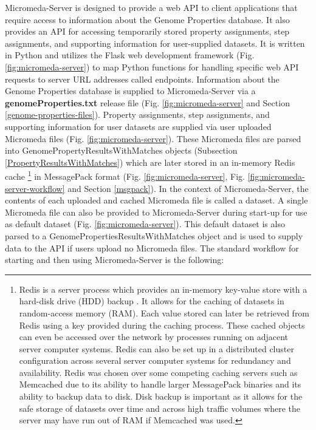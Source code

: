 Micromeda-Server is designed to provide a web API to client applications that require access to information about the Genome Properties database. It also provides an API for accessing temporarily stored property assignments, step assignments, and supporting information for user-supplied datasets. It is written in Python and utilizes the Flask web development framework \cite{grinberg2018flask} (Fig. \ref{fig:micromeda-server}) to map Python functions for handling specific web API requests to server URL addresses called endpoints. Information about the Genome Properties database is supplied to Micromeda-Server via a \textbf{genomeProperties.txt} release file (Fig. \ref{fig:micromeda-server} and Section \ref{genome-properties-files}). Property assignments, step assignments, and supporting information for user datasets are supplied via user uploaded Micromeda files (Fig. \ref{fig:micromeda-server}). These Micromeda files are parsed into GenomePropertyResultsWithMatches objects (Subsection \ref{PropertyResultsWithMatches}) which are later stored in an in-memory Redis cache \footnote{Redis is a server process which provides an in-memory key-value store with a hard-disk drive (HDD) backup \cite{han2011survey}. It allows for the caching of datasets in random-access memory (RAM). Each value stored can later be retrieved from Redis using a key provided during the caching process. These cached objects can even be accessed over the network by processes running on adjacent server computer systems. Redis can also be set up in a distributed cluster configuration across several server computer systems for redundancy and availability. Redis was chosen over some competing caching servers such as Memcached \cite{fitzpatrick2004distributed} due to its ability to handle larger MessagePack binaries \cite{furuhashi2013messagepack} and its ability to backup data to disk. Disk backup is important as it allows for the safe storage of datasets over time and across high traffic volumes where the server may have run out of RAM if Memcached was used.} in MessagePack format \cite{furuhashi2013messagepack} (Fig. \ref{fig:micromeda-server}, Fig. \ref{fig:micromeda-server-workflow} and Section \ref{msgpack}). In the context of Micromeda-Server, the contents of each uploaded and cached Micromeda file is called a dataset. A single Micromeda file can also be provided to Micromeda-Server during start-up for use as default dataset (Fig. \ref{fig:micromeda-server}). This default dataset is also parsed to a GenomePropertiesResultsWithMatches object and is used to supply data to the API if users upload no Micromeda files. The standard workflow for starting and then using Micromeda-Server is the following:

